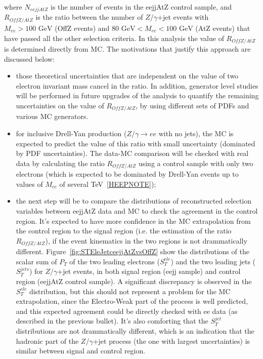 where $N_{eejjAtZ}$ is the number of events in the eejjAtZ control sample, and 
$R_{OffZ/AtZ}$ is the ratio between the number of $Z/\gamma$+jet events 
with $M_{ee} > 100\mbox{ GeV}$ (OffZ events) and $80\mbox{ GeV} < M_{ee} < 100\mbox{ GeV}$ 
(AtZ events) that have passed all the other selection criteria.
In this analysis the value of $R_{OffZ/AtZ}$ is determined directly from MC.
The motivations that justify this approach are discussed below:
%
\begin{itemize}
%
\item those theoretical uncertainties that are independent 
on the value of two electron invariant mass cancel in the ratio.
In addition, generator level studies will be performed 
in future upgrades of the analysis to quantify the
remaining uncertainties on the value of $R_{OffZ/AtZ}$, 
by using different sets of PDFs and various MC generators.
%
%
\item for inclusive Drell-Yan production ($Z/\gamma \rightarrow ee$ with no jets), 
the MC is expected to predict the value of this ratio with small 
uncertainty (dominated by PDF uncertainties). 
The data-MC comparison will be checked with real data by calculating 
the ratio $R_{OffZ/AtZ}$ using a control sample with only two electrons 
(which is expected to be dominated by Drell-Yan events 
up to values of $M_{ee}$ of several TeV~\ref{HEEPNOTE});%
%
\item the next step will be to compare the distributions of reconstructed selection 
variables between eejjAtZ data and MC to check the agreement in the control region.
It's expected to have more confidence in the MC extrapolation 
from the control region to the signal region (i.e. the estimation of the ratio $R_{OffZ/AtZ}$), 
if the event kinematics in the two regions is not drammatically different.
Figure~\ref{fig:STEleJetceejjAtZvsOffZ}
show the distributions of the scalar sum of $P_{T}$ of the two leading electrons ($S_{T}^{ele}$) 
and the two leading jets ($S_{T}^{jets}$) for $Z/\gamma$+jet events, 
in both signal region (eejj sample) and control region (eejjAtZ control sample). 
A significant discrepancy is observed 
in the $S_{T}^{ele}$ distribution, but this should not represent 
a problem for the MC extrapolation, since the Electro-Weak part of the process 
is well predicted, and this expected agreement could be directly checked with ee data 
(as described in the previous bullet).
It's also comforting that the $S_{T}^{jet}$ distributions are not drammatically different, 
which is an indication that the hadronic part of the $Z/\gamma$+jet process 
(the one with largest uncertainties) is similar between 
signal and control region.  
%
\end{itemize}

